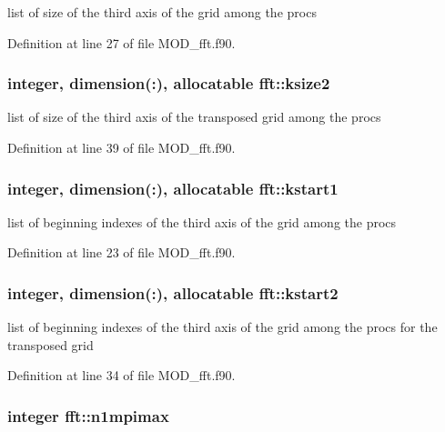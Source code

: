 list of size of the third axis of the grid among the procs 



Definition at line 27 of file M\-O\-D\-\_\-fft.\-f90.

\hypertarget{classfft_ab61609735e4d327559a6a90691a0561b}{
\subsubsection[{ksize2}]{\setlength{\rightskip}{0pt plus 5cm}integer, dimension(\-:), allocatable fft\-::ksize2}}\label{classfft_ab61609735e4d327559a6a90691a0561b}


list of size of the third axis of the transposed grid among the procs 



Definition at line 39 of file M\-O\-D\-\_\-fft.\-f90.

\hypertarget{classfft_a1f4fe9a28b16da2c529fac36e0396d4c}{
\subsubsection[{kstart1}]{\setlength{\rightskip}{0pt plus 5cm}integer, dimension(\-:), allocatable fft\-::kstart1}}\label{classfft_a1f4fe9a28b16da2c529fac36e0396d4c}


list of beginning indexes of the third axis of the grid among the procs 



Definition at line 23 of file M\-O\-D\-\_\-fft.\-f90.

\hypertarget{classfft_a70dc33801ee2d6b2ee67d09d28bd6110}{
\subsubsection[{kstart2}]{\setlength{\rightskip}{0pt plus 5cm}integer, dimension(\-:), allocatable fft\-::kstart2}}\label{classfft_a70dc33801ee2d6b2ee67d09d28bd6110}


list of beginning indexes of the third axis of the grid among the procs for the transposed grid 



Definition at line 34 of file M\-O\-D\-\_\-fft.\-f90.

\hypertarget{classfft_afe626585dd8cb0ac36fab5947a9d2521}{
\subsubsection[{n1mpimax}]{\setlength{\rightskip}{0pt plus 5cm}integer fft\-::n1mpimax}}\label{classfft_afe626585dd8cb0ac36fab5947a9d2521}


